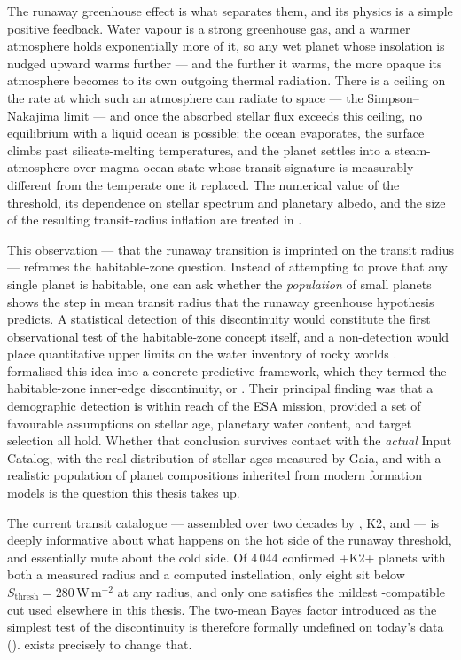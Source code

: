 The runaway greenhouse effect is what separates them, and its
physics is a simple positive feedback.  Water vapour is a strong
greenhouse gas, and a warmer atmosphere holds exponentially more of
it, so any wet planet whose insolation is nudged upward warms
further --- and the further it warms, the more opaque its atmosphere
becomes to its own outgoing thermal radiation.  There is a ceiling
on the rate at which such an atmosphere can radiate to space --- the
Simpson--Nakajima limit \parencite{Nakajima1992,Goldblatt2013} ---
and once the absorbed stellar flux exceeds this ceiling, no
equilibrium with a liquid ocean is possible: the ocean evaporates,
the surface climbs past silicate-melting temperatures, and the
planet settles into a steam-atmosphere-over-magma-ocean state whose
transit signature is measurably different from the temperate one it
replaced.  The numerical value of the threshold, its dependence on
stellar spectrum and planetary albedo, and the size of the resulting
transit-radius inflation are treated in
.

This observation --- that the runaway transition is imprinted on the
transit radius --- reframes the habitable-zone question.  Instead of
attempting to prove that any single planet is habitable, one can ask
whether the \emph{population} of small planets shows the step in
mean transit radius that the runaway greenhouse hypothesis predicts.
A statistical detection of this discontinuity would constitute the
first observational test of the habitable-zone concept itself, and a
non-detection would place quantitative upper limits on the water
inventory of rocky worlds
\parencite{Turbet2019,BixelApai2020,Bean2017}.
\textcite{Schlecker2024} formalised this idea into a concrete
predictive framework, which they termed the habitable-zone inner-edge
discontinuity, or \HZIED.  Their principal finding was that a
demographic detection is within reach of the ESA \PLATO mission,
provided a set of favourable assumptions on stellar age, planetary
water content, and target selection all hold.  Whether that
conclusion survives contact with the \emph{actual} \PLATO Input
Catalog, with the real distribution of stellar ages measured by
Gaia, and with a realistic population of planet compositions
inherited from modern formation models is the question this thesis
takes up.

The current transit catalogue --- assembled over two decades by
\Kepler{}, K2, and \TESS{} --- is deeply informative about what
happens on the hot side of the runaway threshold, and essentially
mute about the cold side.  Of $4\,044$ confirmed \Kepler+K2+\TESS{}
planets with both a measured radius and a computed instellation,
only eight sit below $S_\mathrm{thresh}=280\,\mathrm{W\,m^{-2}}$ at
any radius, and only one satisfies the mildest \HZIED-compatible
cut used elsewhere in this thesis.  The two-mean Bayes factor
introduced as the simplest test of the discontinuity is therefore
formally undefined on today's data
().  \PLATO exists precisely to change that.


